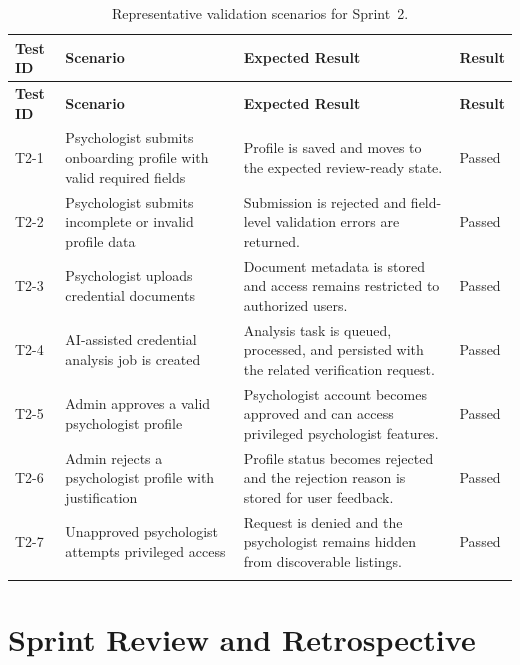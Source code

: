 \documentclass[a4paper,12pt]{report}
\begin{document}
\begin{longtable}{@{} L{0.11\textwidth} L{0.48\textwidth} L{0.23\textwidth} C{0.12\textwidth} @{}}
\toprule
\textbf{Test ID} &
\textbf{Scenario} &
\textbf{Expected Result} &
\textbf{Result} \\
\midrule
\endfirsthead

\toprule
\textbf{Test ID} &
\textbf{Scenario} &
\textbf{Expected Result} &
\textbf{Result} \\
\midrule
\endhead

T2-1 & Psychologist submits onboarding profile with valid required fields & Profile is saved and moves to the expected review-ready state. & \textcolor{successgreen}{Passed} \\
\midrule
T2-2 & Psychologist submits incomplete or invalid profile data & Submission is rejected and field-level validation errors are returned. & \textcolor{successgreen}{Passed} \\
\midrule
T2-3 & Psychologist uploads credential documents & Document metadata is stored and access remains restricted to authorized users. & \textcolor{successgreen}{Passed} \\
\midrule
T2-4 & AI-assisted credential analysis job is created & Analysis task is queued, processed, and persisted with the related verification request. & \textcolor{successgreen}{Passed} \\
\midrule
T2-5 & Admin approves a valid psychologist profile & Psychologist account becomes approved and can access privileged psychologist features. & \textcolor{successgreen}{Passed} \\
\midrule
T2-6 & Admin rejects a psychologist profile with justification & Profile status becomes rejected and the rejection reason is stored for user feedback. & \textcolor{successgreen}{Passed} \\
\midrule
T2-7 & Unapproved psychologist attempts privileged access & Request is denied and the psychologist remains hidden from discoverable listings. & \textcolor{successgreen}{Passed} \\
\bottomrule
\caption{Representative validation scenarios for Sprint~2.}
\label{tab:sprint2-tests}\\
\end{longtable}

\section{Sprint Review and Retrospective}
\label{sec:sprint2-review}
\end{document}
